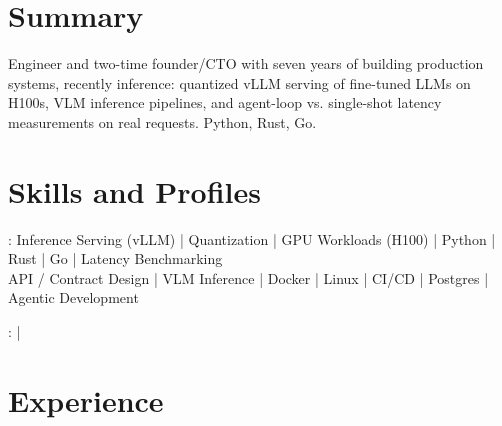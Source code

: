 \documentclass[print]{jack-resume}
\begin{document}
\pagecolor{darkmodeBackground}


\begin{minipage}[t][1cm][t]{.03\textwidth}
    \hfill
\end{minipage}

\section{Summary}
Engineer and two-time founder/CTO with seven years of building production systems, recently inference: quantized vLLM serving of fine-tuned LLMs on H100s, VLM inference pipelines, and agent-loop vs. single-shot latency measurements on real requests. Python, Rust, Go.
\sectionsep

\section{Skills and Profiles}
:
Inference Serving (vLLM) \hfill | \hfill
Quantization \hfill | \hfill
GPU Workloads (H100) \hfill | \hfill
Python \hfill | \hfill
Rust \hfill | \hfill
Go \hfill | \hfill
Latency Benchmarking \\
\hspace{1.0cm} API / Contract Design \hfill | \hfill
VLM Inference \hfill | \hfill
Docker \hfill | \hfill
Linux \hfill | \hfill
CI/CD \hfill | \hfill
Postgres \hfill | \hfill
Agentic Development \\

\raggedright{
    :
      \href{https://www.linkedin.com/in/jack-sturtevant/}{ \ExternalLink} |
     \href{https://github.com/jacksturt}{ \ExternalLink}}

\section{Experience}
\end{document}
